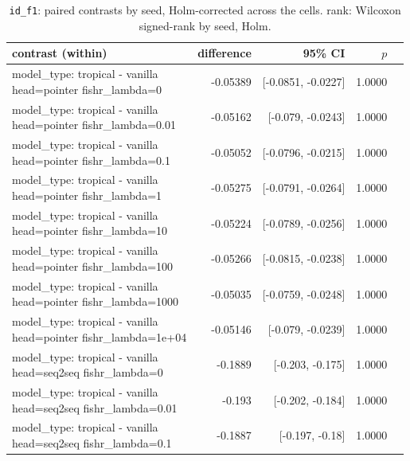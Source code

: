 \documentclass[10pt]{article}
\makeatletter
\newcommand{\stackcell}[1]{\begin{tabular}[t]{@{}l@{}}#1\end{tabular}}
\makeatother
\begin{document}
{\small
\begin{longtable}{lrrrl}
\caption{\texttt{id\_f1}: paired contrasts by seed, Holm-corrected across the cells. rank: Wilcoxon signed-rank by seed, Holm.}\label{tab:paired-id_f1}\\
\toprule
contrast (within) & difference & 95\% CI & $p$ & \\
\midrule
\endhead
\stackcell{model\_type: tropical - vanilla\\\footnotesize head=pointer fishr\_lambda=0 } & -0.05389 & [-0.0851, -0.0227] & 1.0000 & \\
\stackcell{model\_type: tropical - vanilla\\\footnotesize head=pointer fishr\_lambda=0.01 } & -0.05162 & [-0.079, -0.0243] & 1.0000 & \\
\stackcell{model\_type: tropical - vanilla\\\footnotesize head=pointer fishr\_lambda=0.1 } & -0.05052 & [-0.0796, -0.0215] & 1.0000 & \\
\stackcell{model\_type: tropical - vanilla\\\footnotesize head=pointer fishr\_lambda=1 } & -0.05275 & [-0.0791, -0.0264] & 1.0000 & \\
\stackcell{model\_type: tropical - vanilla\\\footnotesize head=pointer fishr\_lambda=10 } & -0.05224 & [-0.0789, -0.0256] & 1.0000 & \\
\stackcell{model\_type: tropical - vanilla\\\footnotesize head=pointer fishr\_lambda=100 } & -0.05266 & [-0.0815, -0.0238] & 1.0000 & \\
\stackcell{model\_type: tropical - vanilla\\\footnotesize head=pointer fishr\_lambda=1000 } & -0.05035 & [-0.0759, -0.0248] & 1.0000 & \\
\stackcell{model\_type: tropical - vanilla\\\footnotesize head=pointer fishr\_lambda=1e+04 } & -0.05146 & [-0.079, -0.0239] & 1.0000 & \\
\stackcell{model\_type: tropical - vanilla\\\footnotesize head=seq2seq fishr\_lambda=0 } & -0.1889 & [-0.203, -0.175] & 1.0000 & \\
\stackcell{model\_type: tropical - vanilla\\\footnotesize head=seq2seq fishr\_lambda=0.01 } & -0.193 & [-0.202, -0.184] & 1.0000 & \\
\stackcell{model\_type: tropical - vanilla\\\footnotesize head=seq2seq fishr\_lambda=0.1 } & -0.1887 & [-0.197, -0.18] & 1.0000 & \\

\end{longtable}}
\end{document}
